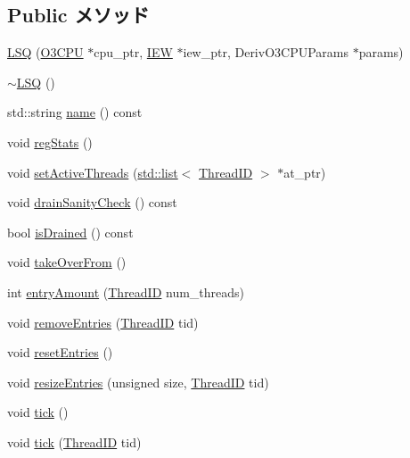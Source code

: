 \subsection*{Public メソッド}
\begin{DoxyCompactItemize}
\item 
\hyperlink{classLSQ_a268c66c8da0a95e3c0778a5e454ba669}{LSQ} (\hyperlink{classLSQ_a44622cf06940413482836cb62931ac3f}{O3CPU} $\ast$cpu\_\-ptr, \hyperlink{classLSQ_a23f60a4095b5240dfcb18a4ec40210a9}{IEW} $\ast$iew\_\-ptr, DerivO3CPUParams $\ast$params)
\item 
\hyperlink{classLSQ_aacb0af998a42267ae15bb83ec2b0753a}{$\sim$LSQ} ()
\item 
std::string \hyperlink{classLSQ_a37627d5d5bba7f4a8690c71c2ab3cb07}{name} () const 
\item 
void \hyperlink{classLSQ_a4dc637449366fcdfc4e764cdf12d9b11}{regStats} ()
\item 
void \hyperlink{classLSQ_aab96bdacf8bd420402cbb543f994e054}{setActiveThreads} (\hyperlink{classstd_1_1list}{std::list}$<$ \hyperlink{base_2types_8hh_ab39b1a4f9dad884694c7a74ed69e6a6b}{ThreadID} $>$ $\ast$at\_\-ptr)
\item 
void \hyperlink{classLSQ_a0240eb42fa57fe5d3788093f62b77347}{drainSanityCheck} () const 
\item 
bool \hyperlink{classLSQ_adf5473c18a3d7c1e88c4a2072bce5526}{isDrained} () const 
\item 
void \hyperlink{classLSQ_a8674059ce345e23aac5086b2c3e24a43}{takeOverFrom} ()
\item 
int \hyperlink{classLSQ_a5d2b0e4e7d98ea4ebd9fb98ac0d91e2f}{entryAmount} (\hyperlink{base_2types_8hh_ab39b1a4f9dad884694c7a74ed69e6a6b}{ThreadID} num\_\-threads)
\item 
void \hyperlink{classLSQ_a53a4e3e73adce8cf2b544117971131c5}{removeEntries} (\hyperlink{base_2types_8hh_ab39b1a4f9dad884694c7a74ed69e6a6b}{ThreadID} tid)
\item 
void \hyperlink{classLSQ_aaf9a05771a835f9f8d634cef36e24d40}{resetEntries} ()
\item 
void \hyperlink{classLSQ_a3672feee3a3eaad63f2e96d46385a099}{resizeEntries} (unsigned size, \hyperlink{base_2types_8hh_ab39b1a4f9dad884694c7a74ed69e6a6b}{ThreadID} tid)
\item 
void \hyperlink{classLSQ_a873dd91783f9efb4a590aded1f70d6b0}{tick} ()
\item 
void \hyperlink{classLSQ_a6968bcfead3fa275f8a1e740c1e337e8}{tick} (\hyperlink{base_2types_8hh_ab39b1a4f9dad884694c7a74ed69e6a6b}{ThreadID} tid)

\end{DoxyCompactItemize}
